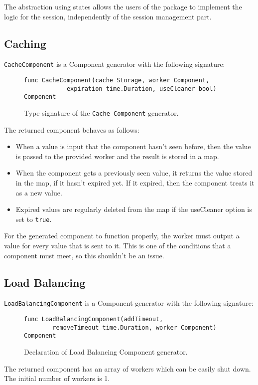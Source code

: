 \documentclass[12pt,a4paper]{article}
\begin{document}
The abstraction using states allows the users of the package to implement the
logic for the session, independently of the session management part.

\subsection{Caching}
\texttt{CacheComponent} is a Component generator with the following signature:
\begin{figure}[h]
\centering
\begin{lstlisting}
func CacheComponent(cache Storage, worker Component, 
            expiration time.Duration, useCleaner bool) Component
\end{lstlisting}
\caption[scale=1.0]{Type signature of the \texttt{Cache Component} generator.}
\label{fig:cacheComp}
\end{figure}

The returned component behaves as follows:
\begin{itemize}
	\item When a value is input that the component hasn't seen before, then
		  the value is passed to the provided worker and the result is stored in
		  a map.
	\item When the component gets a previously seen value, it returns the value
		  stored in the map, if it hasn't expired yet. If it expired, then the component
		  treats it as a new value.
	\item Expired values are regularly deleted from the map if the useCleaner
          option is set to \texttt{true}.
\end{itemize}

For the generated component to function properly, the worker must output
a value for every value that is sent to it. This is one of the conditions
that a component must meet, so this shouldn't be an issue.

\subsection{Load Balancing}
\texttt{LoadBalancingComponent} is a Component generator with the following signature:
\begin{figure}[h]
\centering
\begin{lstlisting}
func LoadBalancingComponent(addTimeout, 
		removeTimeout time.Duration, worker Component) Component
\end{lstlisting}
\caption[scale=1.0]{Declaration of Load Balancing Component generator.}
\label{fig:loadComp}
\end{figure}
The returned component has an array of workers which can be easily shut down.
The initial number of workers is 1. 
\end{document}
